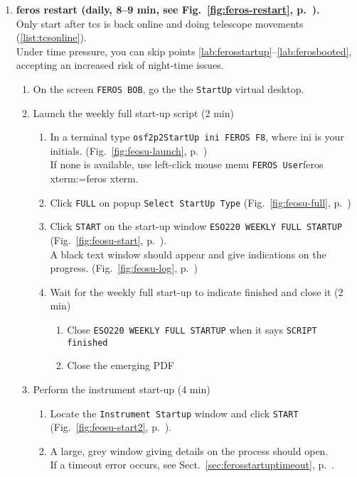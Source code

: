 \documentclass[11pt,fleqn]{book}
\makeatletter
\def\menu#1#2{\texttt{#1}\ifx{}#2\else\@for\@x:=#2\do{$\rightarrow$\texttt{\@x}}\fi}
\def\mmenu#1#2{left-click mouse menu \menu{#1}{#2}}
\def\figref#1{Fig.~\ref{fig:#1}, p.~\pageref{fig:#1}}
\def\secref#1{Sect.~\ref{sec:#1}, p.~\pageref{sec:#1}}
\makeatother
\begin{document}
\begin{enumerate}
  \item \textbf{\gls{feros} restart (daily, 8--9 min, see \figref{feros-restart}).}\\
        Only start after \gls{tcs} is back online and doing telescope movements (\ref{list:tcsonline}).\\
        Under time pressure, you can skip points \ref{lab:ferosstartup}--\ref{lab:ferosbooted}, accepting an increased risk of night-time issues.
        \label{list:feros}
        \begin{enumerate}
         \item \label{lab:ferosstartup} On the screen \texttt{FEROS BOB},  go the the \texttt{StartUp} virtual desktop.
         \item Launch the weekly full start-up script (2 min)
         \begin{enumerate}
            \item In a terminal type \texttt{osf2p2StartUp ini FEROS F8}, where ini is your initials. (\figref{feosu-launch})\\
               If none is available, use \mmenu{FEROS User}{feros xterm}.
            \item Click \texttt{FULL} on popup \texttt{Select StartUp Type} (\figref{feosu-full})
            \item Click \texttt{START} on the start-up window \texttt{ESO220 WEEKLY FULL STARTUP} (\figref{feosu-start}).\\
               A black text window should appear and give indications on the progress. (\figref{feosu-log})
             \item Wait for the weekly full start-up to indicate finished and close it (2 min)
                \begin{enumerate}
                   \item Close \texttt{ESO220 WEEKLY FULL STARTUP} when it says \texttt{SCRIPT finished} 
                   \item Close the emerging PDF
                \end{enumerate}
            \end{enumerate}
         \item Perform the instrument start-up (4 min) 
            \begin{enumerate}
                \item Locate the \texttt{Instrument Startup} window and click \texttt{START} (\figref{feosu-start2}).
                \item A large, grey window giving details on the process should open.\\If a timeout error occurs, see \secref{ferosstartuptimeout}.    

\end{enumerate}
\end{enumerate}
\end{enumerate}
\end{document}
